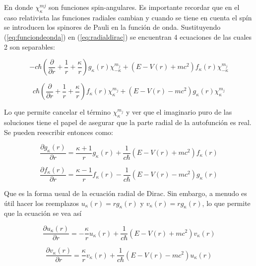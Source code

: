 \documentclass[a4paper, 12pt]{article} %
\begin{document}
En donde $\chi_{\kappa}^{mj}$ son funciones spin-angulares. Es importante
recordar que en el caso relativista las funciones radiales cambian y 
cuando se tiene en cuenta el sp\'in se introducen los spinores de Pauli
en la funci\'on de onda. Sustituyendo (\ref{eq:funciondeonda}) en 
(\ref{eq:radialdirac}) se encuentran 4 ecuaciones de las cuales 2 son 
separables:
 

\begin{equation}
-c \hbar  \left( \frac{\partial}{\partial r}+\frac{1}{r}+\frac{\kappa}{r} \right) g_{\kappa}(r)\chi^{m_j}_{-\kappa} +(E-V(r)+mc^2)f_{\kappa}(r)\chi^{m_j}_{-\kappa}
\end{equation}


\begin{equation}
c \hbar  \left( \frac{\partial}{\partial r}+\frac{1}{r}+\frac{\kappa}{r} \right) f_{\kappa}(r)\chi^{m_j}_{\kappa} +(E-V(r)-mc^2)g_{\kappa}(r)\chi^{m_j}_{\kappa}
\end{equation}


Lo que permite cancelar el t\'ermino $\chi^{m_j}_{\kappa}$ y ver que el 
imaginario puro de las soluciones tiene el papel de asegurar que la parte 
radial de la autofunci\'on es real. Se pueden reescribir entonces como:


\begin{equation}
\frac{\partial g_{\kappa}(r)}{\partial r} =\frac{\kappa+1}{r}g_{\kappa}(r)+\frac{1}{c\hbar}(E-V(r)+mc^2)f_{\kappa}(r)
\end{equation}

\begin{equation}
\frac{\partial f_{\kappa}(r)}{\partial r} =\frac{\kappa-1}{r}f_{\kappa}(r)-\frac{1}{c\hbar}(E-V(r)-mc^2)g_{\kappa}(r)
\end{equation}

Que es la forma usual de la ecuaci\'on radial de Dirac. Sin embargo, a menudo es \'util hacer los reemplazos $u_{\kappa}(r)=rg_{\kappa}(r)$ y $v_{\kappa}(r)=rg_{\kappa}(r)$, lo que permite que la ecuaci\'on se vea as\'i


\begin{equation}\label{eq:rad1}
\frac{\partial u_{\kappa}(r)}{\partial r} =-\frac{\kappa}{r}u_{\kappa}(r)+\frac{1}{c\hbar}(E-V(r)+mc^2)v_{\kappa}(r)
\end{equation}

\begin{equation}\label{eq:rad2}
\frac{\partial v_{\kappa}(r)}{\partial r} =\frac{\kappa}{r}v_{\kappa}(r)+\frac{1}{c\hbar}(E-V(r)-mc^2)u_{\kappa}(r)
\end{equation}
\end{document}
